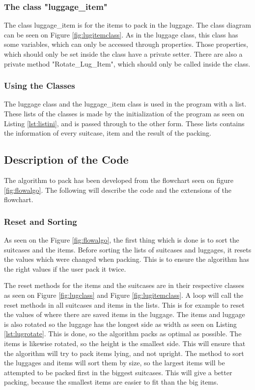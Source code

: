 \subsubsection{The class "luggage\_item"}
The class luggage\_item is for the items to pack in the luggage. The class diagram can be seen on Figure \ref{fig:lugitemclass}. As in the luggage class, this class has some variables, which can only be accessed through properties. Those properties, which should only be set inside the class have a private setter. There are also a private method "Rotate\_Lug\_Item", which should only be called inside the class.
\subsubsection{Using the Classes}
The luggage class and the luggage\_item class is used in the program with a list. These lists of the classes is made by the initialization of the program as seen on Listing \ref{lst:listini}, and is passed through to the other form. These lists contains the information of every suitcase, item and the result of the packing.
\subsection{Description of the Code}
The algorithm to pack has been developed from the flowchart seen on figure \ref{fig:flowalgo}. The following will describe the code and the extensions of the flowchart.
\subsubsection{Reset and Sorting}
As seen on the Figure \ref{fig:flowalgo}, the first thing which is done is to sort the suitcases and the items. Before sorting the lists of suitcases and luggages, it resets the values which were changed when packing. This is to ensure the algorithm has the right values if the user pack it twice. 

The reset methods for the items and the suitcases are in their respective classes as seen on Figure \ref{fig:lugclass} and Figure \ref{fig:lugitemclass}. A loop will call the reset methods in all suitcases and items in the lists. This is for example to reset the values of where there are saved items in the luggage. The items and luggage is also rotated so the luggage has the longest side as width as seen on Listing \ref{lst:lugrotate}. This is done, so the algorithm packs as optimal as possible. The items is likewise rotated, so the height is the smallest side. This will ensure that the algorithm will try to pack items lying, and not upright.
The method to sort the luggages and items will sort them by size, so the largest items will be attempted to be packed first in the biggest suitcases. This will give a better packing, because the smallest items are easier to fit than the big items.
